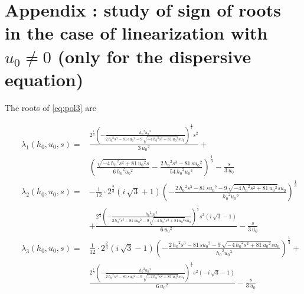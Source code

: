 \section{Appendix : study of sign of roots in the case of linearization with $u_0 \neq 0$ (only for the dispersive equation)}

\indent The roots of \eqref{eq:pol3} are

\begingroup
\scriptsize
\begin{equation}
	\label{eq:lambdaExacts}
	\begin{aligned}
	&& \lambda_1\left( {{h_0}}, {{u_0}}, s \right) = & \frac{2^{\frac{1}{3}} \left(-\frac{{{h_0}}^{2} {{u_0}}^{3}}{2 \, {{h_0}}^{2} s^{3} - 81 \, s {{u_0}}^{2} - 9 \, \sqrt{-4 \, {{h_0}}^{2} s^{2} + 81 \, {{u_0}}^{2}} s {{u_0}}}\right)^{\frac{1}{3}} s^{2}}{3 \, {{u_0}}^{2}} + \\
	&& & {\left(\frac{\sqrt{-4 \, {{h_0}}^{2} s^{2} + 81 \, {{u_0}}^{2}} s}{6 \, {{h_0}}^{2} {{u_0}}^{2}} - \frac{2 \, {{h_0}}^{2} s^{3} - 81 \, s {{u_0}}^{2}}{54 \, {{h_0}}^{2} {{u_0}}^{3}}\right)}^{\frac{1}{3}} - \frac{s}{3 \, {{u_0}}} \\
	&& \lambda_2\left( {{h_0}}, {{u_0}}, s \right) = & -\frac{1}{12} \cdot 2^{\frac{2}{3}} {\left(i \, \sqrt{3} + 1\right)} \left(-\frac{2 \, {{h_0}}^{2} s^{3} - 81 \, s {{u_0}}^{2} - 9 \, \sqrt{-4 \, {{h_0}}^{2} s^{2} + 81 \, {{u_0}}^{2}} s {{u_0}}}{{{h_0}}^{2} {{u_0}}^{3}}\right)^{\frac{1}{3}}\\
	&& & + \frac{2^{\frac{1}{3}} \left(-\frac{{{h_0}}^{2} {{u_0}}^{3}}{2 \, {{h_0}}^{2} s^{3} - 81 \, s {{u_0}}^{2} - 9 \, \sqrt{-4 \, {{h_0}}^{2} s^{2} + 81 \, {{u_0}}^{2}} s {{u_0}}}\right)^{\frac{1}{3}} s^{2} {\left(i \, \sqrt{3} - 1\right)}}{6 \, {{u_0}}^{2}} - \frac{s}{3 \, {{u_0}}} \\
	&& \lambda_3\left( {{h_0}}, {{u_0}}, s \right) = & \frac{1}{12} \cdot 2^{\frac{2}{3}} {\left(i \, \sqrt{3} - 1\right)} \left(-\frac{2 \, {{h_0}}^{2} s^{3} - 81 \, s {{u_0}}^{2} - 9 \, \sqrt{-4 \, {{h_0}}^{2} s^{2} + 81 \, {{u_0}}^{2}} s {{u_0}}}{{{h_0}}^{2} {{u_0}}^{3}}\right)^{\frac{1}{3}} +\\
	&& & \frac{2^{\frac{1}{3}} \left(-\frac{{{h_0}}^{2} {{u_0}}^{3}}{2 \, {{h_0}}^{2} s^{3} - 81 \, s {{u_0}}^{2} - 9 \, \sqrt{-4 \, {{h_0}}^{2} s^{2} + 81 \, {{u_0}}^{2}} s {{u_0}}}\right)^{\frac{1}{3}} s^{2} {\left(-i \, \sqrt{3} - 1\right)}}{6 \, {{u_0}}^{2}} - \frac{s}{3 \, {{u_0}}}
	\end{aligned}
\end{equation}
\endgroup

